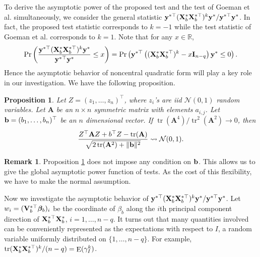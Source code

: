 \documentclass[bj]{imsart}
\DeclareMathOperator{\mytr}{tr}
\DeclareMathOperator{\myE}{E}
\newcommand{\By}{\mathbf{y}}    \newcommand{\Bz}{\mathbf{z}}
\newcommand{\BA}{\mathbf{A}}    \newcommand{\BB}{\mathbf{B}}    \newcommand{\BC}{\mathbf{C}}    \newcommand{\BD}{\mathbf{D}}    \newcommand{\BE}{\mathbf{E}}    \newcommand{\BF}{\mathbf{F}}    \newcommand{\BG}{\mathbf{G}}    \newcommand{\BH}{\mathbf{H}}    \newcommand{\BI}{\mathbf{I}}    \newcommand{\BJ}{\mathbf{J}}    \newcommand{\BK}{\mathbf{K}}    \newcommand{\BL}{\mathbf{L}}
\newcommand{\bfsym}[1]{\ensuremath{\boldsymbol{#1}}}
\def\bbeta{\bfsym \beta}
\theoremstyle{plain}
\newtheorem{proposition}{\quad\quad Proposition}
\theoremstyle{definition}
\newtheorem{remark}{\quad\quad Remark}
\theoremstyle{remark}
\begin{document}
To derive the asymptotic power of the proposed test and the test of Goeman {\rm et al.} \cite{Goeman2006} simultaneously, we consider the general statistic
    ${
\By^{*\top}
    (\BX_b^* \BX_b^{*\top})^{k} 
        \By^*
    }/{\By^{*\top} \By^*}$.
    In fact, the proposed test statistic corresponds to $k=-1$ while the test statistic of Goeman {\rm et al.} \cite{Goeman2006} corresponds to $k=1$.
    Note that for any $x\in \mathbb R$,
    \begin{equation*}
        \Pr\left( 
    \frac{
\By^{*\top}
    (\BX_b^* \BX_b^{*\top})^{k} 
        \By^*
    }{\By^{*\top} \By^*}
    \leq x
        \right)
        =
        \Pr\left( 
\By^{*\top}
\left( 
    (\BX_b^* \BX_b^{*\top})^{k} 
    -x\BI_{n-q}
\right)
        \By^*
    \leq 
    0
\right).
    \end{equation*}
Hence the asymptotic behavior of noncentral quadratic form will play a key role in our investigation.
We have the following proposition.
\begin{proposition}
    Let $Z=(z_1,\ldots, z_n)^\top$, where $z_i$'s are iid $\mathcal N(0,1)$ random variables.
    Let $\BA$ be an $n\times n$ symmetric matrix with elements $a_{i,j}$.
    Let $\mathbf{b}=(b_1,\ldots, b_n)^\top$ be an $n$ dimensional vector.
    If $\mytr(\BA^4)/\mytr^2(\BA^2)\to 0$,
    then
    \begin{equation*}
        \frac{Z^\top \BA Z + b^\top Z - \mytr(\BA)}{\sqrt{2\mytr(\BA^2)+\|\Bb\|^2}}
        \rightsquigarrow \mathcal N(0,1).
    \end{equation*}
    \label{Lemma:normal}
\end{proposition}
\begin{remark}
    Proposition \ref{Lemma:normal} does not impose any condition on $\mathbf{b}$.
    This allows us to give the global asymptotic power function of tests.
    As the cost of this flexibility, we have to make the normal assumption.
\end{remark}


Now we investigate the asymptotic behavior of
    ${
\By^{*\top}
    (\BX_b^* \BX_b^{*\top})^{k} 
        \By^*
    }/{\By^{*\top} \By^*}$.
Let $w_i=(\BV_b^{*\top} \bbeta_b)_i$ be the coordinate of $\beta_b$ along the $i$th principal component direction of $\mathbf{X}_b^{*\top} \mathbf{X}_b^*$, $i=1,\ldots, n-q$.
It turns out that many quantities involved can be conveniently represented as the expectations with respect to $I$, a random variable uniformly distributed on $\{1,\ldots, n-q\}$.
For example, $
        {
            \mytr(\BX_b^* \BX_b^{*\top})^k
        }/
        (n-q )
        =\myE (\gamma_I^k)
$.
\end{document}
